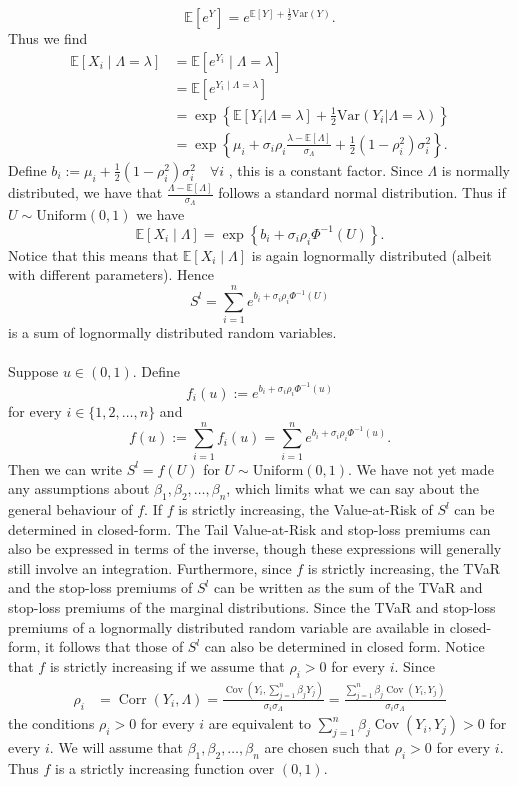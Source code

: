 \documentclass{article}
\DeclareMathOperator{\Cov}{Cov}
\DeclareMathOperator{\Corr}{Corr}
\begin{document}
$$\mathbb{E}\left[e^Y\right] = e^{\mathbb{E}[Y] + \frac{1}{2}\text{Var}(Y)}.$$ 
Thus we find
\begin{align*}
    \mathbb{E}[X_i\mid \Lambda = \lambda] &= \mathbb{E}\left[e^{Y_i}\mid \Lambda = \lambda\right]\\
    &= \mathbb{E}\left[e^{Y_i\mid \Lambda = \lambda}\right]\\
    &= \exp\left\{\mathbb{E}[Y_i|\Lambda = \lambda] + \frac{1}{2}\text{Var}(Y_i|\Lambda = \lambda)\right\}\\
    &= \exp\left\{\mu_i + \sigma_i\rho_i\frac{\lambda - \mathbb{E}[\Lambda]}{\sigma_\Lambda} + \frac{1}{2}(1-\rho_i^2)\sigma_i^2\right\}.
\end{align*}
Define $b_i:= \mu_i + \frac{1}{2}(1-\rho_i^2)\sigma_i^2\quad \forall i$ , this is a constant factor. Since $\Lambda$ is normally distributed, we have that $\frac{\Lambda-\mathbb{E}[\Lambda]}{\sigma_\Lambda}$ follows a standard normal distribution. Thus if $U\sim \text{Uniform}(0,1)$ we have
$$\mathbb{E}[X_i\mid \Lambda] = \exp\left\{b_i+ \sigma_i\rho_i\Phi^{-1}(U)\right\}.$$
Notice that this means that $\mathbb{E}[X_i\mid \Lambda]$ is again lognormally distributed (albeit with different parameters).
Hence 
$$S^l = \sum_{i=1}^n e^{b_i+ \sigma_i\rho_i\Phi^{-1}(U)}$$
is a sum of lognormally distributed random variables. 
\\\\
Suppose $u\in (0,1)$. Define
$$f_i(u) := e^{b_i + \sigma_i \rho_i\Phi^{-1}(u)}$$
for every $i\in \{1,2,\dots,n\}$ and
\begin{equation}\label{formula cdf S^l}
    f(u) := \sum_{i=1}^nf_i(u) = \sum_{i=1}^ne^{b_i + \sigma_i \rho_i\Phi^{-1}(u)}.
\end{equation}
Then we can write $S^l = f(U)$ for $U\sim \text{Uniform}(0,1)$. We have not yet made any assumptions about $\beta_1,\beta_2,\dots,\beta_n$, which limits what we can say about the general behaviour of $f$. If $f$ is strictly increasing, the Value-at-Risk of $S^l$ can be determined in closed-form. The Tail Value-at-Risk and stop-loss premiums can also be expressed in terms of the inverse, though these expressions will generally still involve an integration. Furthermore, since $f$ is strictly increasing, the TVaR and the stop-loss premiums of $S^l$ can be written as the sum of the TVaR and stop-loss premiums of the marginal distributions. Since the TVaR and stop-loss premiums of a lognormally distributed random variable are available in closed-form, it follows that those of $S^l$ can also be determined in closed form. Notice that $f$ is strictly increasing if we assume that $\rho_i > 0$ for every $i$. Since
\begin{align*}
\rho_i &= \Corr(Y_i,\Lambda)
= \frac{\Cov\left(Y_i,\sum_{j=1}^n\beta_jY_j\right)}{\sigma_i\sigma_\Lambda}
= \frac{\sum_{j=1}^n \beta_j\Cov(Y_i,Y_j)}{\sigma_i\sigma_\Lambda}
\end{align*}
the conditions $\rho_i > 0$ for every $i$ are equivalent to $\sum_{j=1}^n \beta_j\Cov(Y_i,Y_j) > 0$ for every $i$. We will assume that $\beta_1,\beta_2,\dots,\beta_n$ are chosen such that $\rho_i > 0$ for every $i$. Thus $f$ is a strictly increasing function over $(0,1)$.
\end{document}
